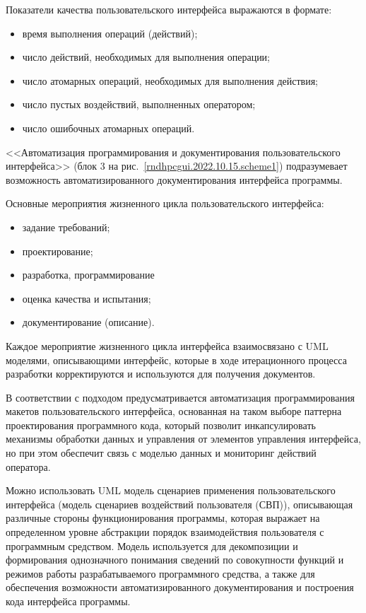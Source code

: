 Показатели качества пользовательского интерфейса выражаются в формате: 
\begin{itemize}
	\item время выполнения операций (действий); 
	\item число действий, необходимых для выполнения операции; 
	\item число атомарных операций, необходимых для выполнения действия; 
	\item число пустых воздействий, выполненных оператором; 
	\item число ошибочных атомарных операций.
\end{itemize}

<<Автоматизация программирования и документирования пользовательского интерфейса>> (блок 3 на рис.~\ref{rndhpcgui.2022.10.15.scheme1}) подразумевает возможность автоматизированного документирования интерфейса программы.
	
Основные мероприятия жизненного цикла пользовательского интерфейса: 
\begin{itemize}
	\item задание требований; 
	\item проектирование; 
	\item разработка, программирование
	\item оценка качества и испытания; 
	\item документирование (описание).
\end{itemize}

	
Каждое мероприятие жизненного цикла интерфейса взаимосвязано с UML моделями, описывающими интерфейс, которые в ходе итерационного процесса разработки корректируются и используются для получения документов.
	
В соответствии с подходом предусматривается автоматизация программирования макетов пользовательского интерфейса, основанная на таком выборе паттерна проектирования программного кода, который позволит инкапсулировать механизмы обработки данных и управления от элементов управления интерфейса, но при этом обеспечит связь с моделью данных и мониторинг действий оператора.
	
Можно использовать UML модель сценариев применения пользовательского интерфейса (модель сценариев воздействий пользователя (СВП)), описывающая различные стороны функционирования программы, которая выражает на определенном уровне абстракции порядок взаимодействия пользователя с программным средством. Модель используется для декомпозиции и формирования однозначного понимания сведений по совокупности функций и режимов работы разрабатываемого программного средства, а также для обеспечения возможности автоматизированного документирования и построения кода интерфейса программы.


